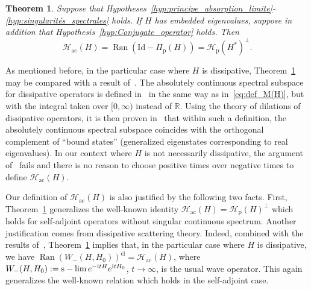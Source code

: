 \documentclass[10pt]{amsart}
\newtheorem{theo}{Theorem}[section]
\theoremstyle{definition}\newtheorem{defi}[theo]{Definition}\newtheorem{rema}[theo]{Remark}\newtheorem{exam}[theo]{Example}\newtheorem{exem}[theo]{Example}\newtheorem{nota}[theo]{Notation}
\newcommand{\Hi}{\mathcal{H}}
\newcommand{\R}{\mathbb{R}}
\newcommand{\rmp}{\mathrm{p}}
\newcommand{\acr}{\mathrm{ac}}
\DeclareMathOperator{\slim}{s-lim}
\DeclareMathOperator{\Ran}{Ran}
\begin{document}
\begin{theo}\label{thm:caracterisation_espace_absolument_continu}
Suppose that Hypotheses~\ref{hyp:principe_absorption_limite}-\ref{hyp:singularités_spectrales} holds. If $H$ has embedded eigenvalues, suppose in addition that Hypothesis~\ref{hyp:Conjugate_operator} holds. Then
\begin{equation*}
\Hi_\acr(H)=\Ran\left(\mathrm{Id}-\Pi_\rmp(H)\right)=\Hi_\rmp(H^*)^\perp.
\end{equation*}
\end{theo}


As mentioned before, in the particular case where $H$ is dissipative, Theorem~\ref{thm:caracterisation_espace_absolument_continu} may be compared with a result of~\cite{Da80_01}. The absolutely continuous spectral subspace for dissipative operators is defined in~\cite{Da80_01} in the same way as in~\eqref{eq:def_M(H)}, but with the integral taken over $[0,\infty)$ instead of $\R$. Using the theory of dilations of dissipative operators, it is then proven in~\cite{Da80_01} that within such a definition, the absolutely continuous spectral subspace coincides with the orthogonal complement of ``bound states'' (generalized eigenstates corresponding to real eigenvalues). In our context where $H$ is not necessarily dissipative, the argument of~\cite{Da80_01} fails and there is no reason to choose positive times over negative times to define $\Hi_\acr(H)$.

Our definition of $\Hi_\acr(H)$ is also justified by the following two facts. First, Theorem~\ref{thm:caracterisation_espace_absolument_continu} generalizes the well-known identity $
\Hi_\acr(H) = \Hi_{\rmp}(H)^\perp $ which holds for self-adjoint operators without singular continuous spectrum. Another justification comes from dissipative scattering theory. Indeed, combined with the results of~\cite{Da78_01,Da80_01,FaFr18_01,Ma75_01}, Theorem~\ref{thm:caracterisation_espace_absolument_continu} implies that, in the particular case where $H$ is dissipative, we have $\Ran(W_-(H,H_0))^{\mathrm{cl}}=\Hi_\acr(H)$, where $W_-(H,H_0) := \slim \linebreak e^{-\mathrm{i}tH} e^{\mathrm{i}tH_0}$, $t\to\infty$, is the usual wave operator. This again generalizes the well-known relation which holds in the self-adjoint case.
\end{document}
